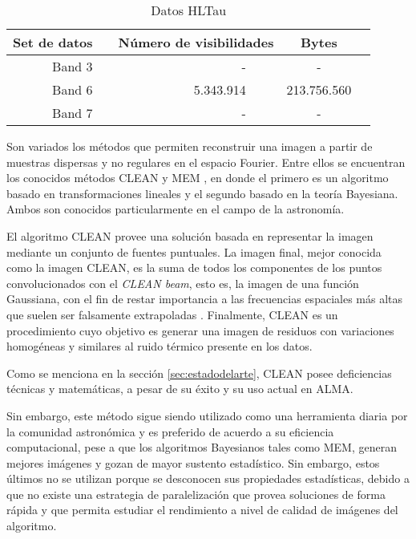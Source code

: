 \newcommand{\ra}[1]{\renewcommand{\arraystretch}{#1}}
\begin{table}[h!]
\centering
\ra{1.2}
\caption{Datos HLTau}
\label{tab:data}
\begin{tabular}{@{}rcrrcr@{}} 
\toprule
 \multicolumn{1}{c}{{\bf Set de datos}} & \phantom{a} & \multicolumn{2}{c}{{\bf Número de visibilidades}}  & \multicolumn{1}{c}{{\bf Bytes}} \\
 \midrule
 Band 3   && - &&  -\\
 Band 6   && 5.343.914 &&  213.756.560\\    
 Band 7   && - &&  -\\
 \toprule
\end{tabular}
\end{table}


Son variados los métodos que permiten reconstruir una imagen a partir de muestras dispersas y no regulares en el espacio Fourier. Entre ellos se encuentran los conocidos métodos CLEAN \citep{CLEAN} y MEM \citep{MEM}, en donde el primero es un algoritmo basado en transformaciones lineales y el segundo basado en la teoría Bayesiana. Ambos son conocidos particularmente en el campo de la astronomía.


El algoritmo CLEAN provee una solución basada en representar la imagen mediante un conjunto de fuentes puntuales. La imagen final, mejor conocida como la imagen CLEAN, es la suma de todos los componentes de los puntos convolucionados con el \textit{CLEAN beam}, esto es, la imagen de una función Gaussiana, con el fin de restar importancia a las frecuencias espaciales más altas que suelen ser falsamente extrapoladas \citep{libroAstro2}. Finalmente, CLEAN es un procedimiento cuyo objetivo es generar una imagen de residuos con variaciones homogéneas y similares al ruido térmico presente en los datos. 

Como se menciona en la sección \ref{sec:estadodelarte}, CLEAN posee deficiencias técnicas y matemáticas, a pesar de su éxito y su uso actual en ALMA.

Sin embargo, este método sigue siendo utilizado como una herramienta diaria por la comunidad astronómica y es preferido de acuerdo a su eficiencia computacional, pese a que los algoritmos Bayesianos tales como MEM, generan mejores imágenes y gozan de mayor sustento estadístico. Sin embargo, estos últimos no se utilizan porque se desconocen sus propiedades estadísticas, debido a que no existe una estrategia de paralelización que provea soluciones de forma rápida y que permita estudiar el rendimiento a nivel de calidad de imágenes del algoritmo.

